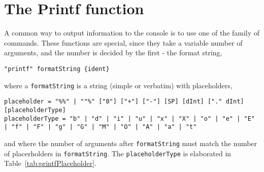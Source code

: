 \section{The Printf function}
\label{sec:printf}
A common way to output information to the console is to use one of the family of  commands. These functions are special, since they take a variable number of arguments, and the number is decided by the first - the format string,
\begin{lstlisting}[language=ebnf]
"printf" formatString {ident}
\end{lstlisting}
where a \lstinline[language=ebnf]!formatString! is a string (simple or verbatim) with placeholders,
\begin{lstlisting}[language=ebnf]
placeholder = "%%" | ""%" ["0"] ["+"] ["-"] [SP] [dInt] ["." dInt] [placeholderType]
placeholderType = "b" | "d" | "i" | "u" | "x" | "X" | "o" | "e" | "E" | "f" | "F" | "g" | "G" | "M" | "O" | "A" | "a" | "t"
\end{lstlisting}
and where the number of arguments after \lstinline[language=ebnf]!formatString! must match the number of placerholders in \lstinline[language=ebnf]!formatString!. The \lstinline[language=ebnf]!placeholderType! is elaborated in Table~\ref{tab:printfPlaceholder}.
